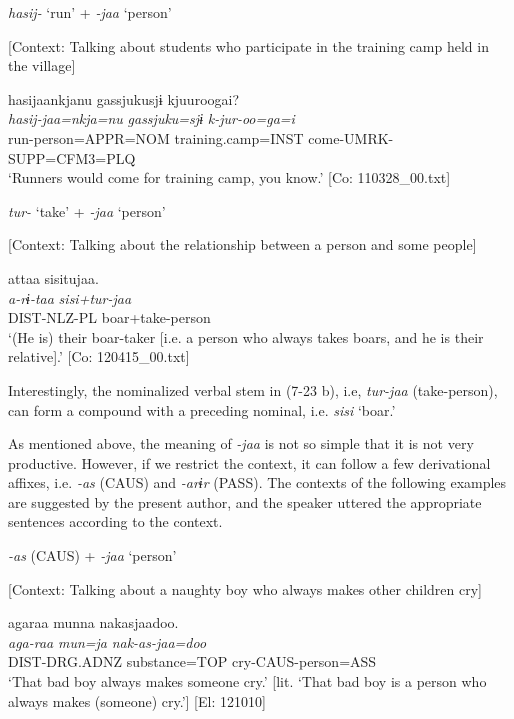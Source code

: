 \ea \label{ex:7:23}\ea \label{ex:7:a}\textit{hasij-} ‘run’ + \textit{{}-jaa} ‘person’

    [Context: Talking about students who participate in the training camp held in the village]

\glll  hasijaankjanu  {\textbar}gassjuku{\textbar}sjɨ  kjuuroogai?\\
\textit{hasij-jaa=nkja=nu}  \textit{gassjuku=sjɨ}  \textit{k-jur-oo=ga=i}\\
run-person=APPR=NOM  training.camp=INST  come-UMRK-SUPP=CFM3=PLQ\\
\glt ‘Runners would come for training camp, you know.’ [Co: 110328\_00.txt]

\ex \label{ex:7:b}\textit{tur-} ‘take’ + \textit{{}-jaa} ‘person’

    [Context: Talking about the relationship between a person and some people]

\glll  attaa   sisitujaa.\\
\textit{a-rɨ-taa}  \textit{sisi+tur-jaa}\\
DIST-NLZ-PL  boar+take-person\\
\glt ‘(He is) their boar-taker [i.e. a person who always takes boars, and he is their relative].’ [Co: 120415\_00.txt]
\z
\z

Interestingly, the nominalized verbal stem in (7-23 b), i.e, \textit{tur-jaa} (take-person), can form a compound with a preceding nominal, i.e. \textit{sisi} ‘boar.’

As mentioned above, the meaning of \textit{{}-jaa} is not so simple that it is not very productive. However, if we restrict the context, it can follow a few derivational affixes, i.e. \textit{{}-as} (CAUS) and \textit{{}-arɨr} (PASS). The contexts of the following examples are suggested by the present author, and the speaker uttered the appropriate sentences according to the context.

\ea \label{ex:7:24}
\ea \label{ex:7:24a}\textit{{}-as} (CAUS) + \textit{{}-jaa} ‘person’

    [Context: Talking about a naughty boy who always makes other children cry]

\glll  agaraa  munna  nakasjaadoo.\\
\textit{aga-raa}  \textit{mun=ja}  \textit{nak-as-jaa=doo}\\
DIST-DRG.ADNZ  substance=TOP  cry-CAUS-person=ASS\\
\glt ‘That bad boy always makes someone cry.’ [lit. ‘That bad boy is a person who always makes (someone) cry.’] [El: 121010]

